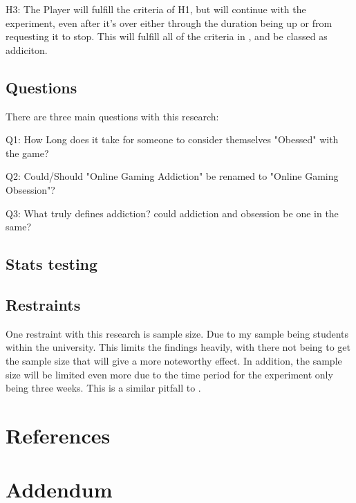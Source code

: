 \documentclass[conference]{IEEEtran}
\begin{document}
H3: The Player will fulfill the criteria of H1, but will continue with the experiment, even after it's over either through the duration being up or from requesting it to stop. This will fulfill all of the criteria in \cite{NHSHamp24}, and be classed as addiciton. \\
\subsection{Questions}
There are three main questions with this research:

Q1: How Long does it take for someone to consider themselves "Obessed" with the game?

Q2: Could/Should "Online Gaming Addiction" be renamed to "Online Gaming Obsession"?

Q3: What truly defines addiction? could addiction and obsession be one in the same?\\
\subsection {Stats testing}

\subsection {Restraints}
One restraint with this research is sample size. Due to my sample being students within the university. This limits the findings heavily, with there not being to get the sample size that will give a more noteworthy effect. In addition, the sample size will be limited even more due to the time period for the experiment only being three weeks. This is a similar pitfall to \cite{Naaj2021}.\\



\section*{References}





\section {Addendum}
\end{document}
